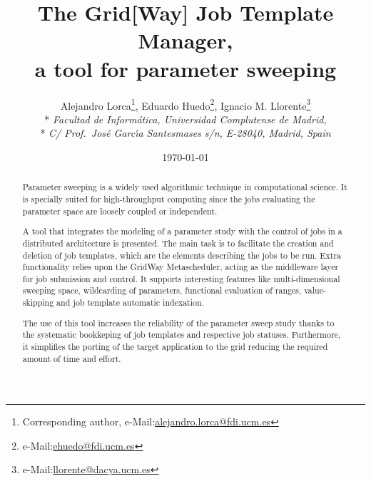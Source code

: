 \documentclass[12pt,a4paper]{article}
\title{The Grid[Way] Job Template Manager,\\ a tool for parameter sweeping}
\author{\bigskip
{Alejandro Lorca\footnote{Corresponding author, e-Mail:\href{mailto:alejandro.lorca@fdi.ucm.es}{alejandro.lorca@fdi.ucm.es}}, Eduardo Huedo\footnote{e-Mail:\href{mailto:ehuedo@fdi.ucm.es}{ehuedo@fdi.ucm.es}}, Ignacio M. Llorente\footnote{e-Mail:\href{mailto:llorente@dacya.ucm.es}{llorente@dacya.ucm.es}}}\\* \vspace{-0.5ex}
{\small \em Facultad de Inform{\'a}tica, Universidad Complutense de Madrid,}\\*
{\small \em C/ Prof.\ Jos\'e Garc\'{\i}a Santesmases s/n, E-28040, Madrid, Spain}
}
\date{\today}
\begin{document}
\maketitle
\begin{abstract}
Parameter sweeping is a widely used algorithmic technique in computational science. It is specially suited for high-throughput computing since the jobs evaluating the parameter space are loosely coupled or independent. 

A tool that integrates the modeling of a parameter study with the control of jobs in a distributed architecture is presented. The main task is to facilitate the creation and deletion of job templates, which are the elements describing the jobs to be run. Extra functionality relies upon the GridWay Metascheduler, acting as the middleware layer for job submission and control. It supports interesting features like multi-dimensional sweeping space, wildcarding of parameters, functional evaluation of ranges, value-skipping and job template automatic indexation.

The use of this tool increases the reliability of the parameter sweep study thanks to the systematic bookkeping of job templates and respective job statuses. Furthermore, it simplifies the porting of the target application to the grid reducing the required amount of time and effort.
\end{abstract}
\end{document}
